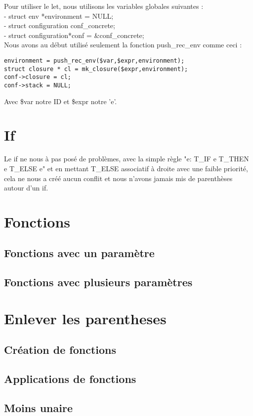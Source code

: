 \documentclass{report}
\begin{document}
Pour utiliser le let, nous utilisons les variables globales suivantes :\\
- struct env *environment = NULL;\\
- struct configuration conf\_concrete;\\
- struct configuration*conf = \&conf\_concrete;\\
Nous avons au début utilisé seulement la fonction push\_rec\_env comme ceci :
\begin{verbatim}
environment = push_rec_env($var,$expr,environment);
struct closure * cl = mk_closure($expr,environment);
conf->closure = cl;
conf->stack = NULL;
\end{verbatim}
Avec \$var notre ID et \$expr notre 'e'.


\section{If}

Le if ne nous à pas posé de problèmes, avec la simple règle "e: T\_IF e T\_THEN e T\_ELSE e" et en mettant T\_ELSE associatif à droite avec une faible priorité, cela ne nous a créé aucun conflit et nous n'avons jamais mis de parenthèses autour d'un if.

\section{Fonctions}
\subsection{Fonctions avec un paramètre}


\subsection{Fonctions avec plusieurs paramètres}


\section{Enlever les parentheses}
\subsection{Création de fonctions}
\subsection{Applications de fonctions}
\subsection{Moins unaire}
\end{document}
